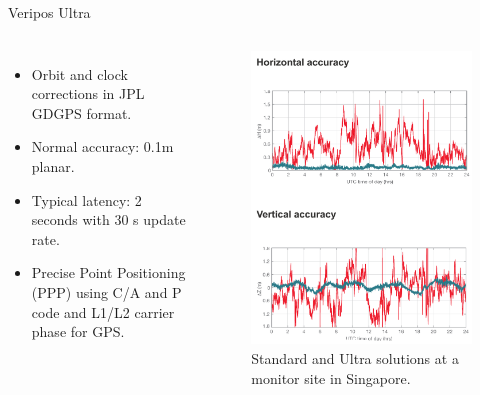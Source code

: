 \documentclass[11pt]{beamer}
\begin{document}
\begin{frame}{Veripos Ultra}
	\begin{columns}[T,onlytextwidth]
		\begin{itemize}	
			\item Orbit and clock corrections in JPL GDGPS format.
			\item Normal accuracy: 0.1m planar. 
			\item Typical latency: 2 seconds with 30 s update rate.%
			\item Precise Point Positioning (PPP) using C/A and P code and L1/L2 carrier phase for GPS.
		\end{itemize}	
		\begin{figure}[T]
			\vspace*{-1cm}
			\includegraphics[height=0.7\textheight]{pic/Ultra.png}
			\caption{Standard and Ultra solutions at a monitor site in Singapore.}
		\end{figure}
	\end{columns}
\end{frame}
\end{document}
